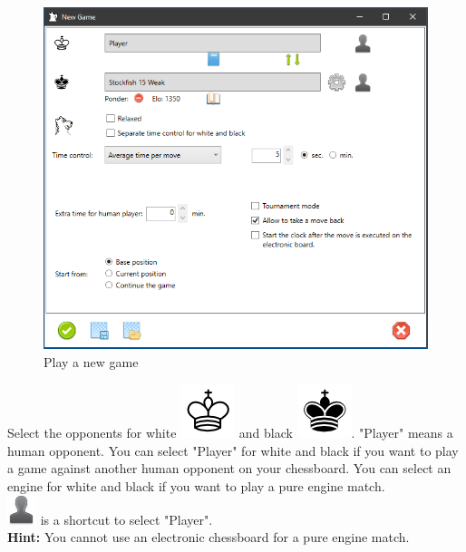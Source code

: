 \documentclass[11pt,a4paper]{article}
\begin{document}
\begin{figure}[H]
	\centering
	\includegraphics[scale=0.7]{NewGame2.png}
	\caption{Play a new game}
	\label{fig:NewGame2}
\end{figure}

Select the opponents for white \includegraphics[scale=0.4]{KingW.png} and black \includegraphics[scale=0.4]{KingB.png}. "Player" means a human opponent. You can select "Player" for white and black if you want to play a game against another human opponent on your chessboard. You can select an engine for white and black if you want to play a pure engine match.\\
\includegraphics[scale=0.4]{user_silhouette.png} is a shortcut to select "Player".\\
\textbf{Hint:} You cannot use an electronic chessboard for a pure engine match.\\
\end{document}
